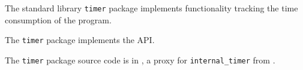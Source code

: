 
The standard library {\tt timer} package implements functionality tracking 
the time consumption of the program.

The {\tt timer} package implements the  API.

The {\tt timer} package source code is in , 
a proxy for 
{\tt internal\_timer} from  .

